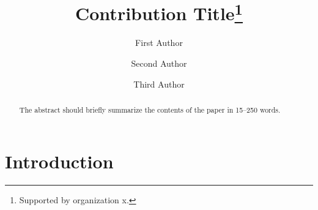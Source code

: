 \documentclass[runningheads]{llncs}
\begin{document}
%
\title{Contribution Title\thanks{Supported by organization x.}}
%
%
\author{First Author \and
Second Author \and
Third Author}
%
%
%
\maketitle              %
%
\begin{abstract}
The abstract should briefly summarize the contents of the paper in
15--250 words.

\end{abstract}

\section{Introduction}
\label{sec:introduction}
\end{document}
